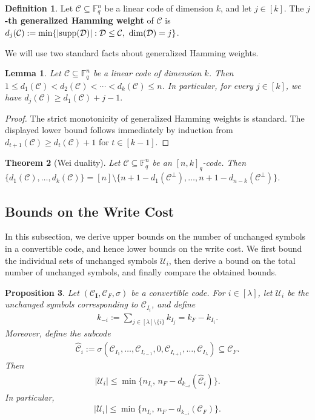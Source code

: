 \documentclass[conference, 10pt]{IEEEtran}
\theoremstyle{plain}
\newtheorem{theorem}{Theorem}
\newtheorem{lemma}[theorem]{Lemma}
\newtheorem{proposition}[theorem]{Proposition}
\theoremstyle{definition}
\newtheorem{definition}{Definition}
\newcommand{\numberset}{\mathbb}
\newcommand{\F}{\numberset{F}}
\newcommand{\supp}{\textup{supp}}
\newcommand{\mC}{\mathcal{C}}
\newcommand{\mU}{\mathcal{U}}
\newcommand{\mD}{\mathcal{D}}
\begin{document}
\begin{definition}
Let $\mC\subseteq \F_q^n$ be a linear code of dimension $k$, and let $j\in [k]$. The \textbf{$j$-th generalized Hamming weight} of $\mC$ is $d_j(\mC):=\min\{ |\supp(\mD)| : \mD\le \mC,\ \dim(\mD)=j\}$. 
\end{definition}

We will use two standard facts about generalized Hamming weights.

\begin{lemma}\label{lem:ghw-increasing-rewrite}
Let $\mC\subseteq \F_q^n$ be a linear code of dimension $k$. Then $1\le d_1(\mC)<d_2(\mC)<\cdots<d_k(\mC)\le n$. In particular, for every $j\in [k]$, we have $d_j(\mC)\ge d_1(\mC)+j-1.$
\end{lemma}

\begin{proof}
The strict monotonicity of generalized Hamming weights is standard. The displayed lower bound follows immediately by induction from $d_{t+1}(\mC)\ge d_t(\mC)+1$ for $t\in [k-1]$.
\end{proof}

\begin{theorem}[Wei duality] \cite[Thm. 3]{wei1991generalized}\label{thm:wei-duality-rewrite}
Let $\mC\subseteq \F_q^n$ be an $[n,k]_q$-code. Then $\{d_1(\mC),\dots,d_k(\mC)\}=[n]\setminus \{n+1-d_1(\mC^\perp),\dots,n+1-d_{n-k}(\mC^\perp)\}$. 
\end{theorem}

\subsection{Bounds on the Write Cost}
\label{subsec:boundsunchanged}

In this subsection, we derive upper bounds on the number of unchanged symbols in a convertible code, and hence lower bounds on the write cost. We first bound the individual sets of unchanged symbols $\mU_i$, then derive a bound on the total number of unchanged symbols, and finally compare the obtained bounds.


\begin{proposition}\label{prop:ghw-unchanged-rewrite}
Let $(\mC_{\textbf{I}},\mC_F,\sigma)$ be a convertible code. For $i\in [\lambda]$, let $\mU_i$ be the unchanged symbols corresponding to $\mC_{I_i}$, and define
\begin{align*} k_{-i}:=\sum_{j\in [\lambda]\setminus\{i\}} k_{I_j}=k_F-k_{I_i}. \end{align*}
Moreover, define the subcode
\begin{align*} \widehat{\mC}_i:=\sigma(\mC_{I_1},\dots,\mC_{I_{i-1}},0,\mC_{I_{i+1}},\dots,\mC_{I_\lambda})\subseteq \mC_F. \end{align*}
Then
\begin{align*} |\mU_i|\le \min\{n_{I_i},\, n_F-d_{k_{-i}}(\widehat{\mC}_i)\}. \end{align*}
In particular,
\begin{align*} |\mU_i|\le \min\{n_{I_i},\, n_F-d_{k_{-i}}(\mC_F)\}. \end{align*}
\end{proposition}
\end{document}
